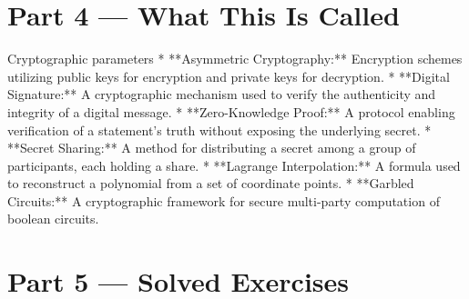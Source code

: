 \documentclass[12pt, a4paper]{book}
\begin{document}
\newpage

\section{Part 4 --- What This Is Called}

\begin{namedconcept}{Cryptographic parameters}
* **Asymmetric Cryptography:** Encryption schemes utilizing public keys for encryption and private keys for decryption.
* **Digital Signature:** A cryptographic mechanism used to verify the authenticity and integrity of a digital message.
* **Zero-Knowledge Proof:** A protocol enabling verification of a statement's truth without exposing the underlying secret.
* **Secret Sharing:** A method for distributing a secret among a group of participants, each holding a share.
* **Lagrange Interpolation:** A formula used to reconstruct a polynomial from a set of coordinate points.
* **Garbled Circuits:** A cryptographic framework for secure multi-party computation of boolean circuits.
\end{namedconcept}

\newpage

\section{Part 5 --- Solved Exercises}
\end{document}
